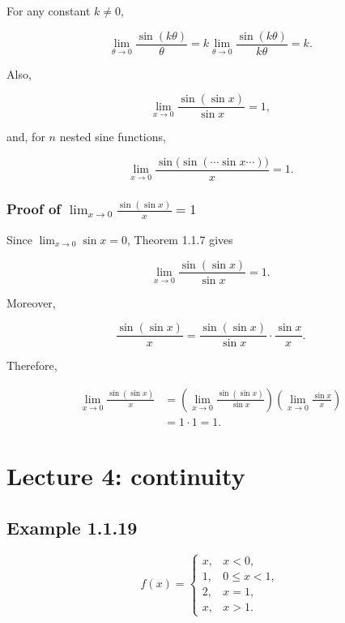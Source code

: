 \documentclass[11pt,a4paper]{article}
\begin{document}
For any constant \(k\ne0\),

\[
\lim_{\theta\to0}\frac{\sin(k\theta)}{\theta}
=k\lim_{\theta\to0}\frac{\sin(k\theta)}{k\theta}=k.
\]

Also,

\[
\lim_{x\to0}\frac{\sin(\sin x)}{\sin x}=1,
\]

and, for \(n\) nested sine functions,

\[
\lim_{x\to0}
\frac{\sin\bigl(\sin(\cdots\sin x\cdots)\bigr)}{x}=1.
\]

\subsubsection{\texorpdfstring{Proof of
\(\displaystyle\lim_{x\to0}\frac{\sin(\sin x)}{x}=1\)}{Proof of \textbackslash displaystyle\textbackslash lim\_\{x\textbackslash to0\}\textbackslash frac\{\textbackslash sin(\textbackslash sin x)\}\{x\}=1}}\label{proof-of-displaystylelim_xto0fracsinsin-xx1}

Since \(\lim_{x\to0}\sin x=0\), Theorem 1.1.7 gives

\[
\lim_{x\to0}\frac{\sin(\sin x)}{\sin x}=1.
\]

Moreover,

\[
\frac{\sin(\sin x)}{x}
=\frac{\sin(\sin x)}{\sin x}\cdot\frac{\sin x}{x}.
\]

Therefore,

\[
\begin{aligned}
\lim_{x\to0}\frac{\sin(\sin x)}{x}
&=\left(\lim_{x\to0}\frac{\sin(\sin x)}{\sin x}\right)
\left(\lim_{x\to0}\frac{\sin x}{x}\right)\\
&=1\cdot1=1.
\end{aligned}
\]

\section{Lecture 4: continuity}\label{lecture-4-continuity}

\subsection{Example 1.1.19}\label{example-1.1.19}

\[
f(x)=
\begin{cases}
x, & x<0,\\
1, & 0\leq x<1,\\
2, & x=1,\\
x, & x>1.
\end{cases}
\]
\end{document}
